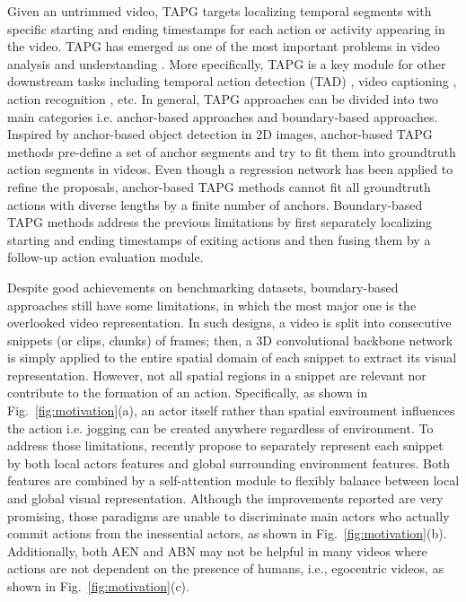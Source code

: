 \documentclass[sn-mathphys]{sn-jnl}
\theoremstyle{thmstyleone}\newtheorem{theorem}{Theorem}\newtheorem{proposition}[theorem]{Proposition}
\theoremstyle{thmstyletwo}\newtheorem{example}{Example}\newtheorem{remark}{Remark}
\theoremstyle{thmstylethree}\newtheorem{definition}{Definition}
\begin{document}
Given an untrimmed video, TAPG targets localizing temporal segments with specific starting and ending timestamps for each action or activity appearing in the video. TAPG has emerged as one of the most important problems in video analysis and understanding \cite{anchor_2, Jiyang2017, CTAP, Gao_2018_CVPR}. More specifically, TAPG is a key module for other downstream tasks including temporal action detection (TAD) \cite{caba2015activitynet, THUMOS14}, video captioning \cite{krishna2017dense}, action recognition \cite{Kinetics}, etc. In general, TAPG approaches can be divided into two main categories i.e. anchor-based approaches and boundary-based approaches. Inspired by anchor-based object detection in 2D images, anchor-based TAPG methods \cite{actionproposal_2016, FasterR_CNN_Action, anchor_1, anchor_2, anchor_3} pre-define a set of anchor segments and try to fit them into groundtruth action segments in videos. Even though a regression network has been applied to refine the proposals, anchor-based TAPG methods cannot fit all groundtruth actions with diverse lengths by a finite number of anchors. Boundary-based TAPG methods \cite{lin2018bsn, BSN++, bmn, dbg, xu2020gtad, KhoaVo_ICASSP, KhoaVo_Access} address the previous limitations by first separately localizing  starting and ending timestamps of exiting actions and then fusing them by a follow-up action evaluation module.

Despite good achievements on benchmarking datasets, boundary-based approaches \cite{lin2018bsn, BSN++, bmn, dbg, xu2020gtad} still have some limitations, in which the most major one is the overlooked video representation. In such designs, a video is split into consecutive snippets (or clips, chunks) of  frames; then, a 3D convolutional backbone network \cite{C3D, i3d_2017, 2_stream_1, SlowFast} is simply applied to the entire spatial domain of each snippet to extract its visual representation. However, not all spatial regions in a snippet are relevant nor contribute to the formation of an action. Specifically, as shown in Fig.~\ref{fig:motivation}(a), an actor itself rather than spatial environment influences the action i.e. jogging can be created anywhere regardless of environment. To address those limitations, \cite{KhoaVo_ICASSP, KhoaVo_Access} recently propose to separately represent each snippet by both local actors features and global surrounding environment features. Both features are combined by a self-attention module to flexibly balance between local and global visual representation. 
Although the improvements reported \cite{KhoaVo_ICASSP, KhoaVo_Access} are very promising, those paradigms are unable to discriminate main actors who actually commit actions from the inessential actors, as shown in Fig.~\ref{fig:motivation}(b). Additionally, both AEN and ABN may not be helpful in many videos where actions are not dependent on the presence of humans, i.e., egocentric videos, as shown in Fig.~\ref{fig:motivation}(c).
\end{document}
